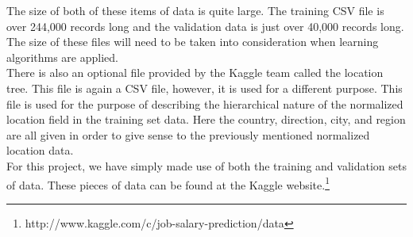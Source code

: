 The size of both of these items of data is quite large. The training CSV file is over 244,000 records
long and the validation data is just over 40,000 records long. The size of these files will need to
be taken into consideration when learning algorithms are applied.\\

There is also an optional file provided by the Kaggle team called the location tree. This file is 
again a CSV file, however, it is used for a different purpose. This file is used for the purpose of
describing the hierarchical nature of the normalized location field in the training set data. Here
the country, direction, city, and region are all given in order to give sense to the previously
mentioned normalized location data.\\

For this project, we have simply made use of both the training and validation sets of data. These pieces
of data can be found at the Kaggle website.\footnote{http://www.kaggle.com/c/job-salary-prediction/data}
